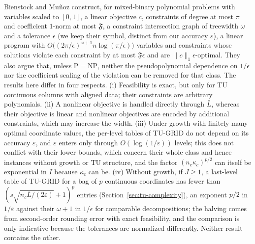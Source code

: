 \begin{remark}\label{rem:tu-bm}
Bienstock and Mu\~noz \cite[Theorems~4 and~15]{BienstockMunoz2018} construct,
for mixed-binary polynomial problems with variables scaled to $[0,1]$, a linear
objective $c$, constraints of degree at most $\pi$ and coefficient $1$-norm at
most $\mathfrak F$, a constraint intersection graph of treewidth $\omega$ and a
tolerance $\epsilon$ (we keep their symbol, distinct from our accuracy
$\varepsilon$), a linear program with
$O\bigl((2\pi/\epsilon)^{\omega+1}n\log(\pi/\epsilon)\bigr)$ variables and
constraints whose solutions violate each constraint by at most
$\mathfrak F\epsilon$ and are $\lVert c\rVert_1\epsilon$-optimal. They also argue that,
unless $\mathrm P=\mathrm{NP}$, neither the pseudopolynomial dependence on
$1/\epsilon$ nor the coefficient scaling of the violation can be removed for that
class. The results here differ in four respects. (i) Feasibility is exact, but
only for TU continuous columns with aligned data; their constraints are
arbitrary polynomials. (ii) A nonlinear objective is handled directly through
$\bar L$, whereas their objective is linear and nonlinear objectives are
encoded by additional constraints, which may increase the width. (iii) Under
growth with finitely many optimal coordinate values, the per-level tables of
TU-GRID do not depend on its accuracy $\varepsilon$, and $\varepsilon$ enters
only through $O(\log(1/\varepsilon))$ levels; this does not conflict with
their lower bounds, which concern their whole class and hence instances
without growth or TU structure, and the factor $(n_c\kappa_c)^{p/2}$ can
itself be exponential in $I$ because $\kappa_c$ can be. (iv) Without growth,
if $J\ge1$, a last-level table of TU-GRID for a bag of $p$ continuous
coordinates has fewer than $(s\sqrt{n_c\bar L/(2\varepsilon)}+1)^p$ entries
(Section~\ref{sec:tu-complexity}), an exponent $p/2$ in $1/\varepsilon$
against their $\omega+1$ in $1/\epsilon$ for comparable decompositions; the
halving comes from second-order rounding error with exact feasibility, and
the comparison is only indicative because the tolerances are normalized
differently. Neither result contains the other.
\end{remark}
